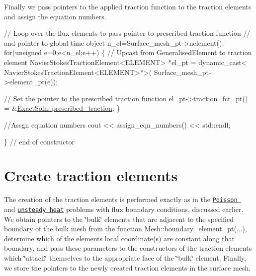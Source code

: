 Finally we pass pointers to the applied traction function to the traction elements and assign the equation numbers.


\begin{DoxyCodeInclude}

 \textcolor{comment}{// Loop over the flux elements to pass pointer to prescribed traction function}
 \textcolor{comment}{// and pointer to global time object}
 n\_el=Surface\_mesh\_pt->nelement();
 \textcolor{keywordflow}{for}(\textcolor{keywordtype}{unsigned} e=0;e<n\_el;e++)
  \{
   \textcolor{comment}{// Upcast from GeneralisedElement to traction element}
   NavierStokesTractionElement<ELEMENT> *el\_pt = 
    \textcolor{keyword}{dynamic\_cast<} NavierStokesTractionElement<ELEMENT>*\textcolor{keyword}{>}(
     Surface\_mesh\_pt->element\_pt(e));

   \textcolor{comment}{// Set the pointer to the prescribed traction function}
   el\_pt->traction\_fct\_pt() = 
    &\hyperlink{namespaceExactSoln_a2a77269d59d7cf56364f0c3b5ae13b41}{ExactSoln::prescribed\_traction};
  \}

 \textcolor{comment}{//Assgn equation numbers}
 cout << assign\_eqn\_numbers() << std::endl; 

\} \textcolor{comment}{// end of constructor}

\end{DoxyCodeInclude}




 

\hypertarget{index_traction}{}\section{Create traction elements}\label{index_traction}
The creation of the traction elements is performed exactly as in the \href{../../../poisson/two_d_poisson_flux_bc2/html/index.html}{\tt Poisson } and \href{../../../unsteady_heat/two_d_unsteady_heat_adapt/html/index.html}{\tt unsteady heat} problems with flux boundary conditions, discussed earlier. We obtain pointers to the \char`\"{}bulk\char`\"{} elements that are adjacent to the specified boundary of the bulk mesh from the function {\ttfamily Mesh\+::boundary\+\_\+element\+\_\+pt}(...), determine which of the elements\textquotesingle{} local coordinate(s) are constant along that boundary, and pass these parameters to the constructors of the traction elements which \char`\"{}attach\char`\"{} themselves to the appropriate face of the \char`\"{}bulk\char`\"{} element. Finally, we store the pointers to the newly created traction elements in the surface mesh.


